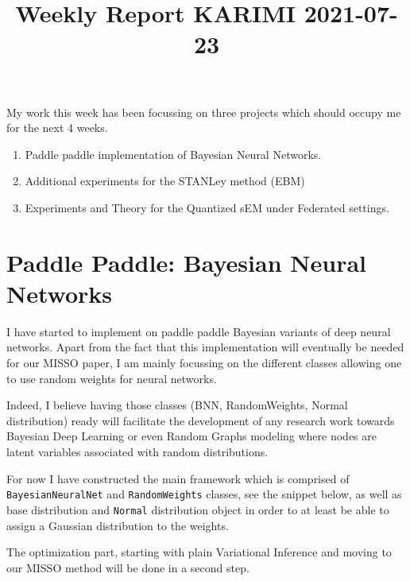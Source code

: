 \documentclass{article}
\begin{document}
\title{Weekly Report KARIMI 2021-07-23}


\date{}
\maketitle

\vspace{-0.5in}

My work this week has been focussing on three projects which should occupy me for the next 4 weeks.
\begin{enumerate}
\item Paddle paddle implementation of Bayesian Neural Networks.
\item Additional experiments for the STANLey method (EBM)
\item Experiments and Theory for the Quantized sEM under Federated settings.
\end{enumerate}


\section{Paddle Paddle: Bayesian Neural Networks}

I have started to implement on paddle paddle Bayesian variants of deep neural networks.
Apart from the fact that this implementation will eventually be needed for our MISSO paper, I am mainly focussing on the different classes allowing one to use random weights for neural networks.

Indeed, I believe having those classes (BNN, RandomWeights, Normal distribution) ready will facilitate the development of any research work towards Bayesian Deep Learning or even Random Graphs modeling where nodes are latent variables associated with random distributions.

For now I have constructed the main framework which is comprised of \lstinline{BayesianNeuralNet} and \lstinline{RandomWeights} classes, see the snippet below, as well as base distribution and \lstinline{Normal} distribution object in order to at least be able to assign a Gaussian distribution to the weights.

The optimization part, starting with plain Variational Inference and moving to our MISSO method will be done in a second step.
\end{document}
